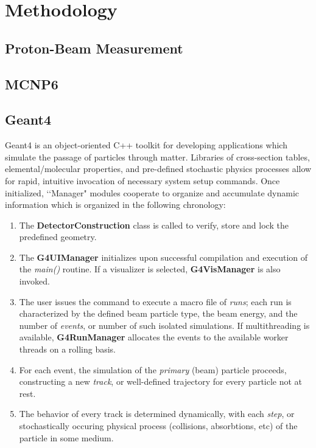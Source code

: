 \documentclass{mc2015}
\begin{document}
\section{Methodology}

\lipsum[5]

\subsection{Proton-Beam Measurement}

\lipsum[6]

\subsection{MCNP6}

\lipsum[7]

\subsection{Geant4}

Geant4 is an object-oriented C++ toolkit for developing applications which simulate the passage of particles through matter. Libraries of cross-section tables, elemental/molecular properties, and pre-defined stochastic physics processes allow for rapid, intuitive invocation of necessary system setup commands. Once initialized, \lq\lq Manager" modules cooperate to organize and accumulate dynamic information which is organized in the following chronology:

\begin{enumerate}
\item The \textbf{DetectorConstruction} class is called to verify, store and lock the predefined geometry.
\item The \textbf{G4UIManager} initializes upon successful compilation and execution of the \emph{main()} routine.  If a visualizer is selected, \textbf{G4VisManager} is also invoked.
\item The user issues the command to execute a macro file of \emph{runs}; each run is characterized by the defined beam particle type, the beam energy, and the number of \emph{events}, or number of such isolated simulations.  If multithreading is available, \textbf{G4RunManager} allocates the events to the available worker threads on a rolling basis.
\item For each event, the simulation of the \emph{primary} (beam) particle proceeds, constructing a new \emph{track}, or well-defined trajectory for every particle not at rest.
\item The behavior of every track is determined dynamically, with each \emph{step}, or stochastically occuring physical process (collisions, absorbtions, etc) of the particle in some medium.
\end{enumerate}
\end{document}
